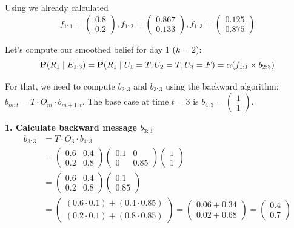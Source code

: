 Using  we already calculated 
\[
f_{1:1} = \begin{pmatrix} 0.8 \\ 0.2 \end{pmatrix}, 
f_{1:2} = \begin{pmatrix} 0.867 \\ 0.133 \end{pmatrix}, 
f_{1:3} = \begin{pmatrix} 0.125 \\ 0.875 \end{pmatrix} 
\]

Let's compute our smoothed belief for day 1 ($k=2$):
\[
\textbf{P}(R_1 \mid E_{1:3}) = \textbf{P}(R_1 \mid U_1 = T, U_2 = T, U_3 = F) = \alpha (f_{1:1} \times b_{2:3})
\]

For that, we need to compute $b_{2:3}$ and $b_{3:3}$ using the backward algorithm: $b_{m:t} = T \cdot O_m \cdot b_{m+1:t}$.
The base case at time $t=3$ is $b_{4:3} = \begin{pmatrix} 1 \\ 1 \end{pmatrix}$.

\textbf{1. Calculate backward message $b_{3:3}$}
\begin{align*}
b_{3:3} &= T \cdot O_3 \cdot b_{4:3} \\
&= \begin{pmatrix}
0.6 & 0.4 \\
0.2 & 0.8
\end{pmatrix}
\begin{pmatrix}
0.1 & 0 \\
0 & 0.85
\end{pmatrix}
\begin{pmatrix}
1 \\ 
1
\end{pmatrix} \\
&= \begin{pmatrix}
0.6 & 0.4 \\
0.2 & 0.8
\end{pmatrix}
\begin{pmatrix}
0.1 \\
0.85
\end{pmatrix} \\
&= \begin{pmatrix}
(0.6 \cdot 0.1) + (0.4 \cdot 0.85) \\
(0.2 \cdot 0.1) + (0.8 \cdot 0.85)
\end{pmatrix}
= \begin{pmatrix}
0.06 + 0.34 \\
0.02 + 0.68
\end{pmatrix}
= \begin{pmatrix}
0.4 \\
0.7
\end{pmatrix}
\end{align*}


